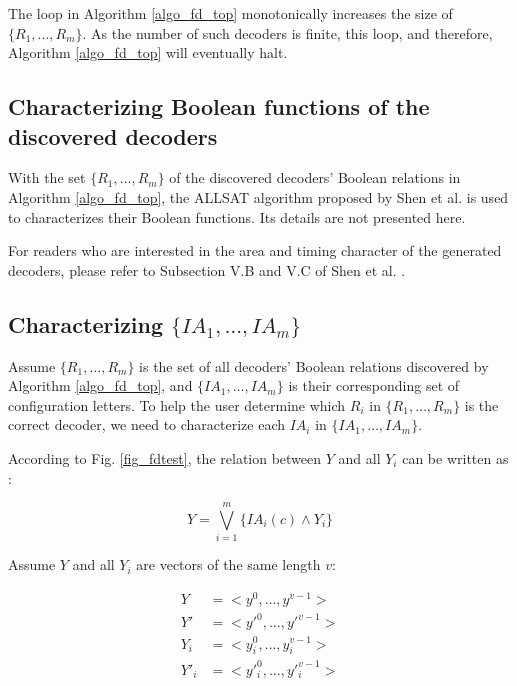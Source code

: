 \documentclass[journal]{IEEEtran}
\begin{document}
The loop in Algorithm \ref{algo_fd_top} monotonically increases the size of $\{R_1,\dots,R_m\}$.
As the number of such decoders is finite,
this loop,
and therefore,
Algorithm \ref{algo_fd_top} will eventually halt.

\subsection{Characterizing Boolean functions of the discovered decoders}
With the set $\{R_1,\dots,R_m\}$ of the discovered decoders' Boolean relations in Algorithm \ref{algo_fd_top},
the ALLSAT algorithm proposed by Shen et al. \cite{ShengYuShen:tcad} is  used to characterizes their Boolean functions.
Its details are not presented here.

For readers who are interested in the area and timing character of the generated decoders,
please refer to Subsection V.B and V.C of Shen et al. \cite{ShengYuShen:tcad11}.

\subsection{Characterizing $\{IA_1,\dots,IA_{m}\}$}\label{subsec_charia}
Assume $\{R_1,\dots,R_{m}\}$ is the set of all decoders' Boolean relations discovered by Algorithm \ref{algo_fd_top},
and $\{IA_1,\dots,IA_{m}\}$ is their corresponding set of configuration letters.
To help the user determine which $R_i$ in $\{R_1,\dots,R_{m}\}$ is the correct decoder,
we need to characterize each $IA_i$ in $\{IA_1,\dots,IA_{m}\}$.

According to Fig. \ref{fig_fdtest},
the relation between $Y$ and all $Y_i$ can be written as :

\begin{equation}\label{equ_fd_nonvectors}
Y=\bigvee _{i=1}^{m} \{IA_i(c)\wedge Y_i\}
\end{equation}

Assume $Y$ and all $Y_i$ are vectors of the same length $v$:

\begin{equation}\label{equ_fd_vectors}
\begin{split}
Y&=<y^{0},\dots,y^{v-1}>\\
Y'&=<y'^{0},\dots,y'^{v-1}>\\
Y_i&=<y^{0}_i,\dots,y^{v-1}_i>\\
Y'_i&=<y'^{0}_i,\dots,y'^{v-1}_i>
\end{split}
\end{equation}
\end{document}

